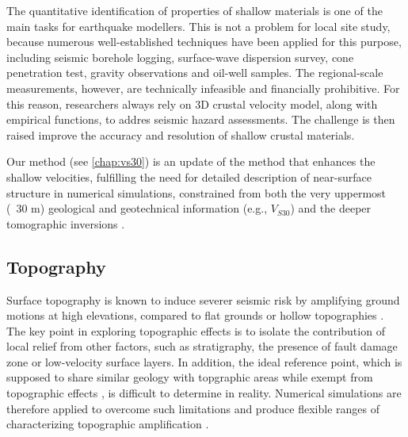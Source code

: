 The quantitative identification of properties of shallow materials is one of the main tasks for earthquake modellers. This is not a problem for local site study, because numerous well-established techniques have been applied for this purpose, including seismic borehole logging, surface-wave dispersion survey, cone penetration test, gravity observations and oil-well samples. The regional-scale measurements, however, are technically infeasible and financially prohibitive. For this reason, researchers always rely on 3D crustal velocity model, along with empirical functions, to addres seismic hazard assessments. The challenge is then raised improve the accuracy and resolution of shallow crustal materials.

Our method (see \cref{chap:vs30}) is an update of the \citet{elyVs30derivedNearsurfaceSeismic2010} method that enhances the shallow velocities, fulfilling the need for detailed description of near-surface structure in numerical simulations, constrained from both the very uppermost (~30 m) geological and geotechnical information (e.g., $V_{S30}$) and the deeper tomographic inversions .



\subsection{Topography}
Surface topography is known to induce severer seismic risk by amplifying ground motions at high elevations, compared to flat grounds or hollow topographies \citep{celebiTopographicalGeologicalAmplifications1987,kawaseTopographyEffectCritical1990,massaExperimentalApproachEstimating2010,burjanekEmpiricalEvidenceLocal2014}. The key point in exploring topographic effects is to isolate the contribution of local relief from other factors, such as stratigraphy, the presence of fault damage zone or low-velocity surface layers. In addition, the ideal reference point, which is supposed to share similar geology with topgraphic areas while exempt from topographic effects \citep{celebiTopographicalGeologicalAmplifications1987,geliEffectTopographyEarthquake1988,chavez-garciaComplexSiteEffects2000}, is difficult to determine in reality. Numerical simulations are therefore applied to overcome such limitations and produce flexible ranges of characterizing topographic ampliﬁcation \citep{booreNoteEffectSimple1972,sanchez-sesmaDiffractionSVRayleigh1991,lovati2011estimation,hartzellGroundMotionPresence2017}.

